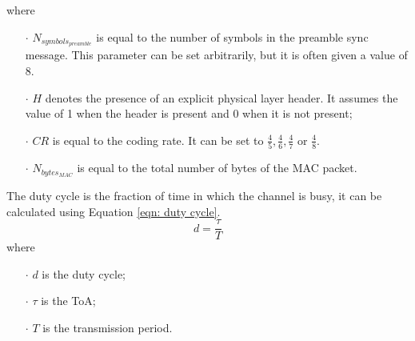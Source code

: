 where
\begin{itemize}[noitemsep,nolistsep]
    \item[\boldmath$\cdot$] $\mathit{N_{symbols_{preamble}}}$ is equal to the number of symbols in the preamble sync message.
        This parameter can be set arbitrarily, but it is often given a value of 8.
    \item[\boldmath$\cdot$] $H$ denotes the presence of an explicit physical layer header. It assumes the
        value of 1 when the header is present and 0 when it is not present;
    \item[\boldmath$\cdot$] $\mathit{CR}$ is equal to the coding rate. It can be set to $\frac{4}{5},\frac{4}{6},
        \frac{4}{7}$ or $\frac{4}{8}$.
    \item[\boldmath$\cdot$] $\mathit{N_{bytes_{MAC}}}$ is equal to the total number of bytes of the \gls{MAC} packet.
\end{itemize}
\vspace{0.55cm}
The duty cycle is the fraction of time in which the channel is busy, it can be calculated using Equation \ref{eqn: duty cycle}.
\begin{equation}
    \label{eqn: duty cycle}
    d = \frac{\tau}{T}
\end{equation}
where
\begin{itemize}[noitemsep,nolistsep]
    \item[\boldmath$\cdot$] $d$ is the duty cycle;
    \item[\boldmath$\cdot$] $\tau$ is the \gls{ToA};
    \item[\boldmath$\cdot$] $T$ is the transmission period.
\end{itemize}


